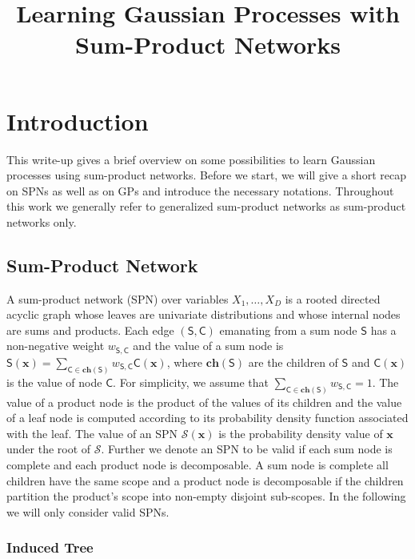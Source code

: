 \documentclass[10pt,letterpaper]{article}
\newcommand{\SPN}{\mathcal{S}}
\newcommand{\x}{\mathbf{x}}
\newcommand{\SumNode}{\mathsf{S}}
\newcommand{\Child}{\mathsf{C}}
\newcommand{\ch}{\ensuremath{\mathbf{ch}}}
\newcommand{\w}{w}
\theoremstyle{mystyle}
\begin{document}
\title{Learning Gaussian Processes with Sum-Product Networks}
\author{}

\maketitle
\section{Introduction}
This write-up gives a brief overview on some possibilities to learn Gaussian processes using sum-product networks.
Before we start, we will give a short recap on SPNs as well as on GPs and introduce the necessary notations. Throughout this work we generally refer to generalized sum-product networks as sum-product networks only.

\subsection{Sum-Product Network}
\label{sec:spns}
A sum-product network (SPN) over variables $X_1, \dots, X_D$ is a rooted directed acyclic graph whose leaves are univariate distributions and whose internal nodes are sums and products. Each edge $(\SumNode,\Child)$ emanating from a sum node $\SumNode$ has a non-negative weight $\w_{\SumNode,\Child}$ and the value of a sum node is $\SumNode(\x) = \sum_{\Child \in \ch(\SumNode)} \w_{\SumNode,\Child} \Child(\x)$, where $\ch(\SumNode)$ are the children of $\SumNode$ and $\Child(\x)$ is the value of node $\Child$. For simplicity, we assume that $\sum_{\Child \in \ch(\SumNode)} \w_{\SumNode,\Child} = 1$. The value of a product node is the product of the values of its children and the value of a leaf node is computed according to its probability density function associated with the leaf. The value of an SPN $\SPN(\x)$ is the probability density value of $\x$ under the root of $\SPN$.
Further we denote an SPN to be valid if each sum node is complete and each product node is decomposable.
A sum node is complete all children have the same scope and a product node is decomposable if the children partition the product's scope into non-empty disjoint sub-scopes.
In the following we will only consider valid SPNs.
\subsubsection{Induced Tree}
\end{document}
